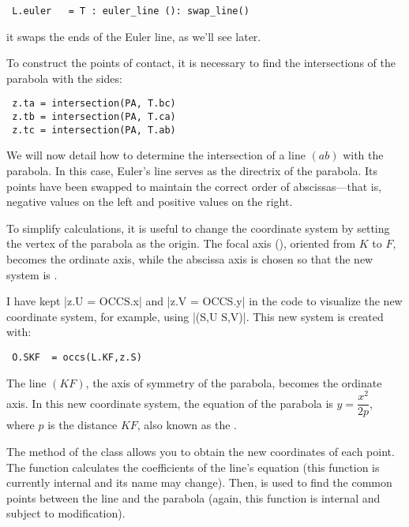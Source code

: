 \begin{mybox}
\begin{verbatim}
 L.euler   = T : euler_line (): swap_line()
\end{verbatim}
\end{mybox}

it swaps the ends of the Euler line, as we'll see later.

 To construct the points of contact, it is necessary to find the intersections of the parabola with the sides:

\begin{mybox}
\begin{verbatim}
 z.ta = intersection(PA, T.bc)
 z.tb = intersection(PA, T.ca)
 z.tc = intersection(PA, T.ab)
\end{verbatim}
\end{mybox}

We will now detail how to determine the intersection of a line $(ab)$ with the parabola. In this case, Euler's line serves as the directrix of the parabola. Its points have been swapped to maintain the correct order of abscissas—that is, negative values on the left and positive values on the right.

To simplify calculations, it is useful to change the coordinate system by setting the vertex of the parabola as the origin. The focal axis (), oriented from $K$ to $F$, becomes the ordinate axis, while the abscissa axis is chosen so that the new system is .

I have kept |z.U = OCCS.x| and |z.V = OCCS.y| in the code to visualize the new coordinate system, for example, using |\tkzDrawSegments[red,->](S,U S,V)|. This new system is created with:

\begin{mybox}
\begin{verbatim}
 O.SKF  = occs(L.KF,z.S)
\end{verbatim}
\end{mybox}

The line $(KF)$, the axis of symmetry of the parabola, becomes the ordinate axis. In this new coordinate system, the equation of the parabola is $y = \dfrac{x^2}{2p}$, where $p$ is the distance $KF$, also known as the .

The  method of the  class allows you to obtain the new coordinates of each point. The  function calculates the coefficients of the line's equation (this function is currently internal and its name may change). Then,  is used to find the common points between the line and the parabola (again, this function is internal and subject to modification).

